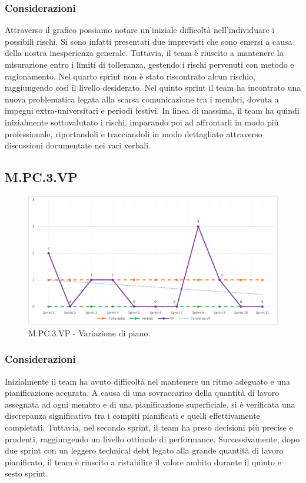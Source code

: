 \documentclass[10pt, a4paper]{article}
\begin{document}
\subsubsection{Considerazioni}
Attraverso il grafico possiamo notare un'iniziale difficoltà nell'individuare i possibili rischi.
Si sono infatti presentati due imprevisti che sono emersi a causa della nostra inesperienza generale.
Tuttavia, il team è riuscito a mantenere la misurazione entro i limiti di tolleranza, gestendo i rischi pervenuti con metodo e ragionamento.
Nel quarto sprint non è stato riscontrato alcun rischio, raggiungendo così il livello desiderato.
Nel quinto sprint il team ha incontrato una nuova problematica legata alla scarsa comunicazione tra i membri, dovuta a impegni extra-universitari e periodi festivi.
In linea di massima, il team ha quindi inizialmente sottovalutato i rischi, imparando poi ad affrontarli in modo più professionale, riportandoli e tracciandoli in modo dettagliato attraverso discussioni documentate nei vari verbali.
\subsection{M.PC.3.VP}
\begin{figure}[H]
\includegraphics[width=15.5cm]{img/metriche/MPC3VP.png}
\caption{M.PC.3.VP - Variazione di piano.}
\end{figure}
\subsubsection{Considerazioni}
Inizialmente il team ha avuto difficoltà nel mantenere un ritmo adeguato e una pianificazione accurata.
A causa di una sovraccarico della quantità di lavoro assegnata ad ogni membro e di una pianificazione superficiale, si è verificata una discrepanza significativa tra i compiti pianificati e quelli effettivamente completati.
Tuttavia, nel secondo sprint, il team ha preso decisioni più precise e prudenti, raggiungendo un livello ottimale di performance.
Successivamente, dopo due sprint con un leggero technical debt legato alla grande quantità di lavoro pianificato, il team è riuscito a ristabilire il valore ambito durante il quinto e sesto sprint.
\end{document}
